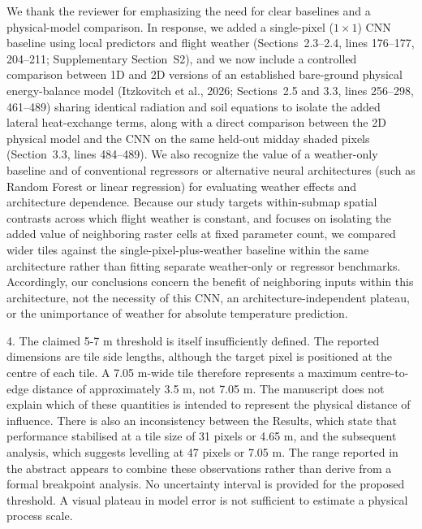 \documentclass[12pt,english]{reviewresponse}
\begin{document}
\begin{revresponse}
We thank the reviewer for emphasizing the need for clear baselines and a physical-model comparison. In response, we added a single-pixel ($1\times 1$) CNN baseline using local predictors and flight weather (Sections~2.3--2.4, lines 176--177, 204--211; Supplementary Section~S2), and we now include a controlled comparison between 1D and 2D versions of an established bare-ground physical energy-balance model (Itzkovitch et al., 2026; Sections~2.5 and 3.3, lines 256--298, 461--489) sharing identical radiation and soil equations to isolate the added lateral heat-exchange terms, along with a direct comparison between the 2D physical model and the CNN on the same held-out midday shaded pixels (Section~3.3, lines 484--489). We also recognize the value of a weather-only baseline and of conventional regressors or alternative neural architectures (such as Random Forest or linear regression) for evaluating weather effects and architecture dependence. Because our study targets within-submap spatial contrasts across which flight weather is constant, and focuses on isolating the added value of neighboring raster cells at fixed parameter count, we compared wider tiles against the single-pixel-plus-weather baseline within the same architecture rather than fitting separate weather-only or regressor benchmarks. Accordingly, our conclusions concern the benefit of neighboring inputs within this architecture, not the necessity of this CNN, an architecture-independent plateau, or the unimportance of weather for absolute temperature prediction.
\end{revresponse}

\begin{revcomment}
4. The claimed 5-7 m threshold is itself insufficiently defined. The reported dimensions are tile side lengths, although the target pixel is positioned at the centre of each tile. A 7.05 m-wide tile therefore represents a maximum centre-to-edge distance of approximately 3.5 m, not 7.05 m. The manuscript does not explain which of these quantities is intended to represent the physical distance of influence. There is also an inconsistency between the Results, which state that performance stabilised at a tile size of 31 pixels or 4.65 m, and the subsequent analysis, which suggests levelling at 47 pixels or 7.05 m. The range reported in the abstract appears to combine these observations rather than derive from a formal breakpoint analysis. No uncertainty interval is provided for the proposed threshold. A visual plateau in model error is not sufficient to estimate a physical process scale.
\end{revcomment}
\end{document}
